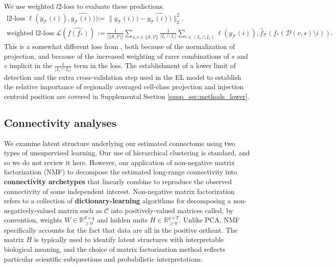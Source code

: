 We use weighted $l2$-loss to evaluate these predictions.
\begin{align*}
\text{l2-loss } \ell (y_{\mathcal T}(i)),\widehat {y_{\mathcal T}(i))}) &:=   \| y_{\mathcal T} (i)) - \widehat {y_{\mathcal T}(i))} \|_2^2. \\
\text{weighted l2-loss } \mathcal L ( \widehat {f(f_*)}) &:= \frac{1}{|\{\mathcal S,\mathcal V\}|} \sum_{s,v \in \{\mathcal S,\mathcal V\}} \frac{1}{ |I_{s} \cap I_v |} \sum_{i \in (I_{s} \cap I_v ) } \ell (y_{\mathcal T}(i)), \hat f_{\mathcal T} (f_*(\mathcal D(v,s) \setminus i)) .
\end{align*}
This is a somewhat different loss from \citet{Knox2019-ot}, both because of the normalization of projection, and because of the increased weighting of rarer combinations of $s$ and $v$ implicit in the $\frac{1}{ |I_{s} \cap I_v |}$ term in the loss.
The establishment of a lower limit of detection and the extra cross-validation step used in the EL model to establish the relative importance of regionally averaged cell-class projection and injection centroid position are covered in Supplemental Section \ref{supp_sec:methods_lower}.

\newpage

\subsection{Connectivity analyses}

We examine latent structure underlying our estimated connectome using two types of unsupervised learning.
Our use of hierarchical clustering is standard, and so we do not review it here.
However, our application of non-negative matrix factorization (NMF) to decompose the estimated long-range connectivity into \textbf{connectivity archetypes} that linearly combine to reproduce the observed connectivity of some independent interest.
Non-negative matrix factorization refers to a collection of \textbf{dictionary-learning} algorithms for decomposing a non-negatively-valued matrix such as $\mathcal C $ into positively-valued matrices called, by convention, weights $W \in \mathbb R^{S \times q}_{\geq 0}$ and hidden units $H \in \mathbb R^{q  \times T}_{\geq 0}$.
Unlike PCA, NMF specifically accounts for the fact that data are all in the positive orthant.
The matrix $H$ is typically used to identify latent structures with interpretable biological meaning, and the choice of matrix factorization method reflects particular scientific subquestions and probabilistic interpretations. 


